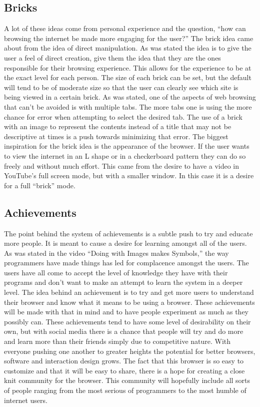 \documentclass[11pt]{article}
\begin{document}
\subsection{Bricks}
A lot of these ideas come from personal experience and the question, “how can browsing the internet be made more engaging for the user?” The brick idea came about from the idea of direct manipulation. As was stated the idea is to give the user a feel of direct creation, give them the idea that they are the ones responsible for their browsing experience. This allows for the experience to be at the exact level for each person. The size of each brick can be set, but the default will tend to be of moderate size so that the user can clearly see which site is being viewed in a certain brick. As was stated, one of the aspects of web browsing that can’t be avoided is with multiple tabs. The more tabs one is using the more chance for error when attempting to select the desired tab. The use of a brick with an image to represent the contents instead of a title that may not be descriptive at times is a push towards minimizing that error. The biggest inspiration for the brick idea is the appearance of the browser. If the user wants to view the internet in an L shape or in a checkerboard pattern they can do so freely and without much effort. This came from the desire to have a video in YouTube’s full screen mode, but with a smaller window. In this case it is a desire for a full “brick” mode. 

\subsection{Achievements}
The point behind the system of achievements is a subtle push to try and educate more people. It is meant to cause a desire for learning amongst all of the users. As was stated in the video “Doing with Images makes Symbols,” the way programmers have made things has led for complacence amongst the users. The users have all come to accept the level of knowledge they have with their programs and don’t want to make an attempt to learn the system in a deeper level. The idea behind an achievement is to try and get more users to understand their browser and know what it means to be using a browser. These achievements will be made with that in mind and to have people experiment as much as they possibly can. These achievements tend to have some level of desirability on their own, but with social media there is a chance that people will try and do more and learn more than their friends simply due to competitive nature. With everyone pushing one another to greater heights the potential for better browsers, software and interaction design grows. The fact that this browser is so easy to customize and that it will be easy to share, there is a hope for creating a close knit community for the browser. This community will hopefully include all sorts of people ranging from the most serious of programmers to the most humble of internet users.
\end{document}
